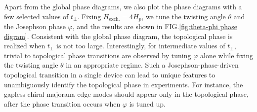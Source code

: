 Apart from the global phase diagrams, we also plot the phase diagrams with a few selected values of $t_\perp$. Fixing $H_{\text{exch.}}=4H_p$, we tune the twisting angle $\theta$ and the Josephson phase $\varphi$, and the results are shown in FIG.\ref{fig:theta-phi phase digram}. Consistent with the global phase diagram, the topological phase is realized when $t_\perp$ is not too large. Interestingly, for intermediate values of $t_\perp$, trivial to topological phase transitions are observed by tuning $\varphi$ alone while fixing the twisting angle $\theta$ in an appropriate regime. Such a Josephson-phase-driven topological transition in a single device can lead to unique features to unambiguously identify the topological phase in experiments. For instance, the gapless chiral majorana edge modes should appear only in the topological phase, after the phase transition occurs when $\varphi$ is tuned up.
